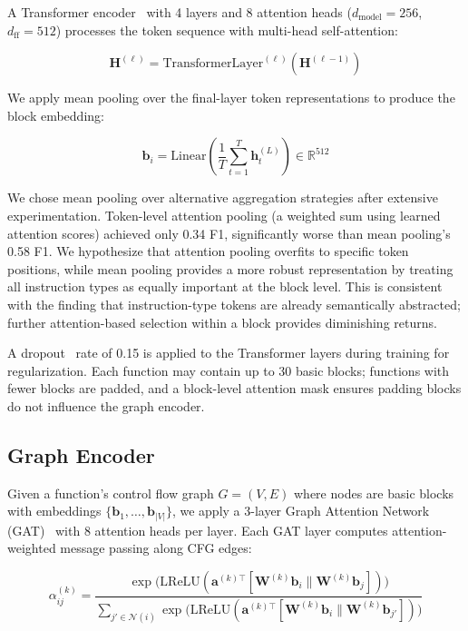 \documentclass[sigconf,nonacm]{acmart}
\begin{document}
A Transformer encoder~\cite{vaswani2017attention} with 4 layers and 8 attention heads ($d_\text{model}{=}256$, $d_\text{ff}{=}512$) processes the token sequence with multi-head self-attention:

\begin{equation}
    \mathbf{H}^{(\ell)} = \text{TransformerLayer}^{(\ell)}(\mathbf{H}^{(\ell-1)})
\end{equation}

We apply mean pooling over the final-layer token representations to produce the block embedding:

\begin{equation}
    \mathbf{b}_i = \text{Linear}\left(\frac{1}{T}\sum_{t=1}^{T} \mathbf{h}_t^{(L)}\right) \in \mathbb{R}^{512}
\end{equation}

We chose mean pooling over alternative aggregation strategies after extensive experimentation. Token-level attention pooling (a weighted sum using learned attention scores) achieved only 0.34 F1, significantly worse than mean pooling's 0.58 F1. We hypothesize that attention pooling overfits to specific token positions, while mean pooling provides a more robust representation by treating all instruction types as equally important at the block level. This is consistent with the finding that instruction-type tokens are already semantically abstracted; further attention-based selection within a block provides diminishing returns.

A dropout~\cite{dropout} rate of 0.15 is applied to the Transformer layers during training for regularization. Each function may contain up to 30 basic blocks; functions with fewer blocks are padded, and a block-level attention mask ensures padding blocks do not influence the graph encoder.

\subsection{Graph Encoder}
\label{sec:graph_encoder}

Given a function's control flow graph $G = (V, E)$ where nodes are basic blocks with embeddings $\{\mathbf{b}_1, \ldots, \mathbf{b}_{|V|}\}$, we apply a 3-layer Graph Attention Network (GAT)~\cite{velivckovic2018graph} with 8 attention heads per layer. Each GAT layer computes attention-weighted message passing along CFG edges:

{\small
\begin{equation}
    \alpha_{ij}^{(k)} = \frac{\exp\!\bigl(\text{LReLU}(\mathbf{a}^{(k)\top}[\mathbf{W}^{(k)}\mathbf{b}_i \| \mathbf{W}^{(k)}\mathbf{b}_j])\bigr)}{\sum_{j' \in \mathcal{N}(i)} \exp\!\bigl(\text{LReLU}(\mathbf{a}^{(k)\top}[\mathbf{W}^{(k)}\mathbf{b}_i \| \mathbf{W}^{(k)}\mathbf{b}_{j'}])\bigr)}
\end{equation}
}
\end{document}
